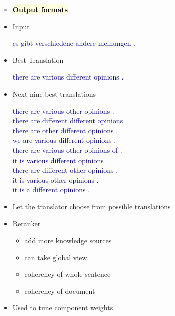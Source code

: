 \documentclass[landscape]{uedslides2C}
\newcommand{\example}[1]{\textcolor{darkblue}{\rm #1}}
\newcommand{\currenttopic}[1]{\colorbox{lightyellow}{\textcolor{black}{\bf #1}}}
\begin{document}

\vspace{-5mm}
\textcolor{darkgrey}{
\begin{itemize} \itemsep -1mm
\item \currenttopic{Output formats}
\end{itemize}
}



\begin{itemize}
\item Input \vspace{-5mm}
\begin{center}
\example{es gibt verschiedene andere meinungen .}
\end{center}

\item  Best Translation \vspace{-5mm}
\begin{center}
\example{there are various different opinions .}
\end{center}

\item  Next nine best translations \vspace{-5mm}
{\footnotesize \begin{center}
\example{
there are various other opinions . \\
there are different different opinions . \\
there are other different opinions . \\
we are various different opinions . \\
there are various other opinions of . \\
it is various different opinions . \\
there are different other opinions . \\
it is various other opinions . \\
it is a different opinions .}
\end{center}}
\end{itemize}

\vspace{20mm}
\begin{itemize}
\item  Let the translator choose from possible translations
\item  Reranker
	\begin{itemize}
	\item add more knowledge sources
	\item can take global view
	\item coherency of whole sentence
	\item coherency of document
	\end{itemize}
\item  Used to tune component weights
\end{itemize}
\end{document}
